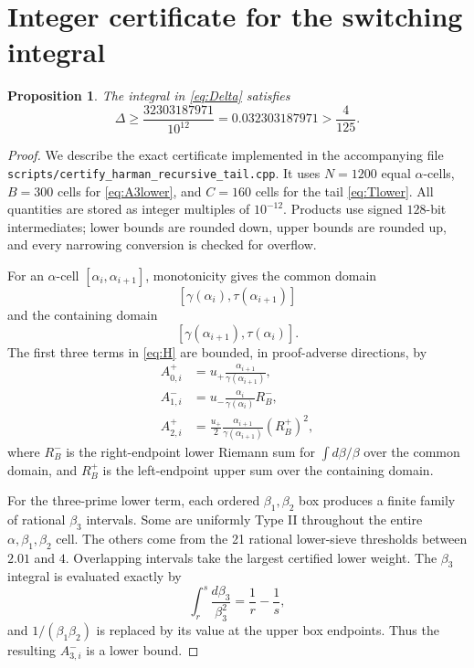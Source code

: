 \documentclass[10pt,reqno]{amsart}
\newcommand{\1}{\mathbf{1}}
\theoremstyle{plain}
\newtheorem{proposition}[theorem]{Proposition}
\theoremstyle{remark}
\begin{document}
\section{Integer certificate for the switching integral}

\begin{proposition}\label{prop:certificate}
The integral in \eqref{eq:Delta} satisfies
\[
  \Delta\ge\frac{32303187971}{10^{12}}
  =0.032303187971>\frac4{125}.
\]
\end{proposition}

\begin{proof}
We describe the exact certificate implemented in the accompanying file
\texttt{scripts/certify\_harman\_recursive\_tail.cpp}.  It uses $N=1200$
equal $\alpha$-cells, $B=300$ cells for \eqref{eq:A3lower}, and $C=160$
cells for the tail \eqref{eq:Tlower}.  All quantities are stored as integer
multiples of $10^{-12}$.  Products use signed $128$-bit intermediates;
lower bounds are rounded down, upper bounds are rounded up, and every
narrowing conversion is checked for overflow.

For an $\alpha$-cell $[\alpha_i,\alpha_{i+1}]$, monotonicity gives the common
domain
\[
 [\gamma(\alpha_i),\tau(\alpha_{i+1})]
\]
and the containing domain
\[
 [\gamma(\alpha_{i+1}),\tau(\alpha_i)].
\]
The first three terms in \eqref{eq:H} are bounded, in proof-adverse
directions, by
\begin{align*}
 A_{0,i}^{+}&=u_+\frac{\alpha_{i+1}}{\gamma(\alpha_{i+1})},\\
 A_{1,i}^{-}&=u_-\frac{\alpha_i}{\gamma(\alpha_i)}R^-_B,
 \\
 A_{2,i}^{+}&=\frac{u_+}{2}
 \frac{\alpha_{i+1}}{\gamma(\alpha_{i+1})}(R^+_B)^2,
\end{align*}
where $R^-_B$ is the right-endpoint lower Riemann sum for
$\int d\beta/\beta$ over the common domain, and $R^+_B$ is the left-endpoint
upper sum over the containing domain.

For the three-prime lower term, each ordered $\beta_1,\beta_2$ box produces
a finite family of rational $\beta_3$ intervals.  Some are uniformly Type
II throughout the entire $\alpha,\beta_1,\beta_2$ cell.  The others come
from the 21 rational lower-sieve thresholds between $2.01$ and $4$.
Overlapping intervals take the largest certified lower weight.  The
$\beta_3$ integral is evaluated exactly by
\[
 \int_r^s\frac{d\beta_3}{\beta_3^2}=\frac1r-\frac1s,
\]
and $1/(\beta_1\beta_2)$ is replaced by its value at the upper box
endpoints.  Thus the resulting $A_{3,i}^{-}$ is a lower bound.


\end{proof}
\end{document}
